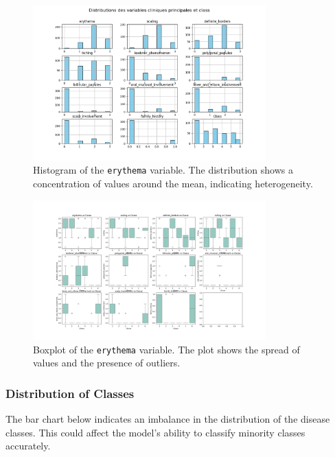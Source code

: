 \documentclass[a4paper,12pt]{article}
\begin{document}
\begin{figure}[h!]
\centering
\includegraphics[width=0.8\textwidth]{Distributions_variables_cliniques_class.png}
\caption{Histogram of the \texttt{erythema} variable. The distribution shows a concentration of values around the mean, indicating heterogeneity.}
\end{figure}

\begin{figure}[h!]
\centering
\includegraphics[width=0.8\textwidth]{boxplot_distribution.png}
\caption{Boxplot of the \texttt{erythema} variable. The plot shows the spread of values and the presence of outliers.}
\end{figure}

\subsubsection{Distribution of Classes}

The bar chart below indicates an imbalance in the distribution of the disease classes. This could affect the model’s ability to classify minority classes accurately.
\end{document}
